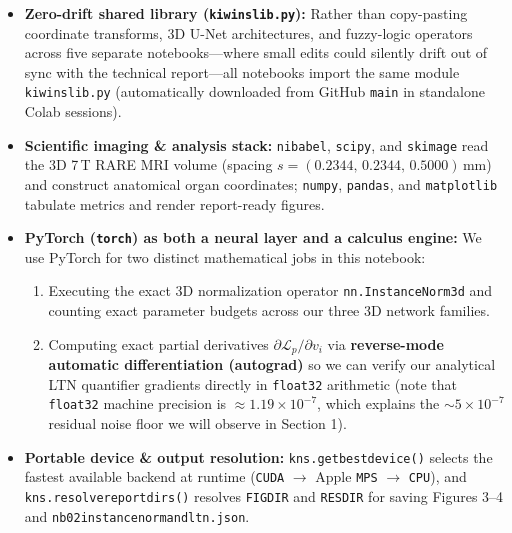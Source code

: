 \documentclass[10pt,a4paper]{article}
\renewcommand{\_}{\origunderscore\allowbreak}
\begin{document}
\begin{itemize}
\item \textbf{Zero-drift shared library (\texttt{kiwi\_ns\_lib.py}):} Rather than copy-pasting coordinate transforms, 3D U-Net architectures, and fuzzy-logic operators across five separate notebooks---where small edits could silently drift out of sync with the technical report---all notebooks import the same module \texttt{kiwi\_ns\_lib.py} (automatically downloaded from GitHub \texttt{main} in standalone Colab sessions).
\item \textbf{Scientific imaging \& analysis stack:} \texttt{nibabel}, \texttt{scipy}, and \texttt{skimage} read the 3D 7\,T RARE MRI volume (spacing $s = (0.2344,\, 0.2344,\, 0.5000)\,\text{mm}$) and construct anatomical organ coordinates; \texttt{numpy}, \texttt{pandas}, and \texttt{matplotlib} tabulate metrics and render report-ready figures.
\item \textbf{PyTorch (\texttt{torch}) as both a neural layer and a calculus engine:} We use PyTorch for two distinct mathematical jobs in this notebook:
\begin{enumerate}
\item Executing the exact 3D normalization operator \texttt{nn.InstanceNorm3d} and counting exact parameter budgets across our three 3D network families.
\item Computing exact partial derivatives $\partial \mathcal{L}_p / \partial v_i$ via \textbf{reverse-mode automatic differentiation (autograd)} so we can verify our analytical LTN quantifier gradients directly in \texttt{float32} arithmetic (note that \texttt{float32} machine precision is $\approx 1.19 \times 10^{-7}$, which explains the $\sim 5 \times 10^{-7}$ residual noise floor we will observe in Section 1).
\end{enumerate}
\item \textbf{Portable device \& output resolution:} \texttt{kns.get\_best\_device()} selects the fastest available backend at runtime (\texttt{CUDA} $\to$ Apple \texttt{MPS} $\to$ \texttt{CPU}), and \texttt{kns.resolve\_report\_dirs()} resolves \texttt{FIG\_DIR} and \texttt{RES\_DIR} for saving Figures 3--4 and \texttt{nb02\_instancenorm\_and\_ltn.json}.
\end{itemize}
\end{document}
